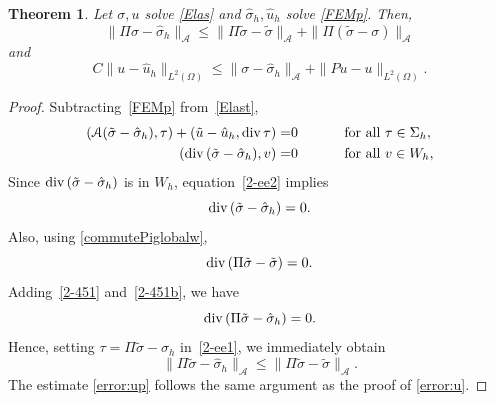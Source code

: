 \documentclass[12pt]{amsart}
\numberwithin{equation}{section}
\newtheorem{theorem}{Theorem}[section]
\theoremstyle{definition}
\theoremstyle{remark}
\renewcommand{\(}{\bigl(}
\renewcommand{\)}{\bigr)}
\newcommand{\uu}{\hat{u}}  %
\newcommand{\ssigma}{\hat{\sigma}}   %
\newcommand{\tsigma}{\tilde{\sigma}}
\newcommand{\tu}{\tilde{u}}
\newcommand{\dive}{{\ensuremath\mathop{\mathrm{div}\,}}} %
\newcommand{\Aa}{\mathcal{A}}
\begin{document}
\begin{theorem}\label{mainerrorthmp}
Let $\sigma, u$ solve \eqref{Elas} and $\ssigma_h, \uu_h$ solve \eqref{FEMp}. Then, 
\begin{equation}\label{error:sigmap}
  \| \Pi \sigma-\ssigma_h\|_{\Aa} \le
  \| \Pi \tsigma-\tsigma\|_{\Aa}+
  \|\Pi (\tsigma-\sigma)\|_{\Aa}
\end{equation}
and
\begin{equation}\label{error:up}
  C \|u-\uu_h\|_{L^2(\Omega)} \le 
  \|\sigma-\ssigma_h\|_{\Aa}
  + \|P u-u\|_{L^2(\Omega)}.
\end{equation}
\end{theorem}
\begin{proof}
  Subtracting~\eqref{FEMp} from~\eqref{Elast}, 
\begin{alignat}{2}
(\Aa (\tsigma-\ssigma_h), \tau)+(\tu-\uu_h, \dive \tau)=& 0 \qquad && {\text{ for all }} \tau \in \Sigma_h, \label{2-ee1} \\
(\dive (\tsigma-\ssigma_h), v)=& 0 \qquad  && {\text{ for all }} v \in W_h,  \label{2-ee2}
\end{alignat}
Since $\dive (\tsigma - \ssigma_h)$ is in  $ W_h$, equation~\eqref{2-ee2}
implies 
\begin{equation}\label{2-451}
\dive(\tsigma-\ssigma_h)=0.
\end{equation}
Also, using \eqref{commutePiglobalw}, 
\begin{equation}\label{2-451b}
    \dive (\Pi \tsigma-\tsigma)= 0 .
\end{equation}
Adding~\eqref{2-451} and~\eqref{2-451b}, we have
\begin{equation}
  \label{eq:2-451c}
  \dive (\Pi \tsigma-\ssigma_h)=0.   
\end{equation}
Hence, setting $\tau =\Pi \tsigma-\ssigma_h$ in~\eqref{2-ee1}, we immediately obtain 
\[
  \|\Pi \tsigma-\ssigma_h\|_{\Aa} \le
  \|\Pi \tsigma-\tsigma \|_{\Aa}.
\]
The estimate \eqref{error:up} follows the same argument as the proof of \eqref{error:u}.
\end{proof}
\end{document}
